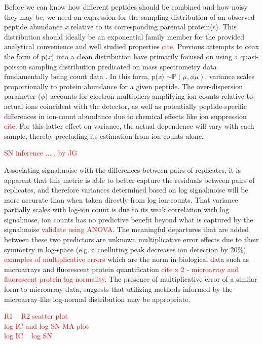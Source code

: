 \documentclass[12pt]{article}
\begin{document}
Before we can know how different peptides should be combined and how noisy they may be, we need an expression for the sampling distribution of an observed peptide abundance \textit{x} relative to its corresponding parental protein(s).  This distribution should ideally be an exponential family member for the provided analytical convenience and well studied properties \textcolor{red}{cite}.  Previous attempts to coax the form of p(\textit{x}) into a clean distribution have primarily focused on using a quasi-poisson sampling distribution predicated on mass spectrometry data fundamentally being count data \cite{Li:2010bj}.  In this form, p(\textit{x}) $\sim \mathbb{P}(\mu, \phi \mu)$, variance scales proportionally to protein abundance for a given peptide.  The over-dispersion parameter ($\phi$) accounts for electron multipliers amplifying ion-counts relative to actual ions coincident with the detector, as well as potentially peptide-specific differences in ion-count abundance due to chemical effects like ion suppression \textcolor{red}{cite}.  For this latter effect on variance, the actual dependence will vary with each sample, thereby precluding its estimation from ion counts alone.

\textcolor{red}{SN inference ... , by JG}


Associating signal:noise with the differences between pairs of replicates, it is apparent that this metric is able to better capture the residuals between pairs of replicates, and therefore variances determined based on log signal:noise will be more accurate than when taken directly from log ion-counts.  That variance partially scales with log-ion count is due to its weak correlation with log signal:nose, ion counts has no predictive benefit beyond what is captured by the signal:noise \textcolor{red}{validate using ANOVA}.  The meaningful departures that are added between these two predictors are unknown multiplicative error effects due to their symmetry in log-space (e.g. a coelluting peak decreases ion detection by 20\%) \textcolor{red}{examples of multiplicative errors} which are the norm in biological data such as microarrays and fluorescent protein quantification \textcolor{red}{cite x 2 - microarray and fluorescent protein log-normality}.  The presence of multiplicative error of a similar form to microarray data, suggests that utilizing methods informed by the microarray-like log-normal distribution may be appropriate.

\textcolor{red}{R1 ~ R2 scatter plot}\\
\textcolor{red}{log IC and log SN MA plot}\\
\textcolor{red}{log IC ~ log SN}
\end{document}
